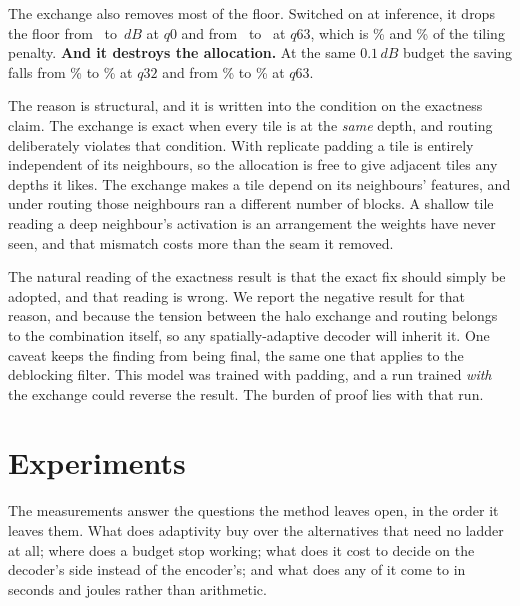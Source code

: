 \documentclass[10pt,twocolumn,letterpaper]{article}
\newcommand{\dB}{\,dB}
\begin{document}
The exchange also removes most of the floor. Switched on at inference, it drops
the floor from \CoupFloorPadLow\ to \CoupFloorCplLow$\dB$ at $q0$ and from
\CoupFloorPadHigh\ to \CoupFloorCplHigh\ at $q63$, which is
\CoupFloorDropLow\% and \CoupFloorDropHigh\% of the tiling penalty.
\textbf{And it destroys the allocation.} At the same $0.1\dB$ budget the saving
falls from \CoupPaddedMid\% to \CoupCoupledMid\% at $q32$ and from
\CoupPaddedHigh\% to \CoupCoupledHigh\% at $q63$.

The reason is structural, and it is written into the condition on the exactness
claim. The exchange is exact when every tile is at the \emph{same} depth, and routing
deliberately violates that condition. With replicate padding a tile is entirely
independent of its neighbours, so the allocation is free to give adjacent tiles
any depths it likes. The exchange makes a tile depend on its neighbours' features, and
under routing those neighbours ran a different number of blocks. A shallow tile
reading a deep neighbour's activation is an arrangement the weights have never
seen, and that mismatch costs more than the seam it removed.

The natural reading of the exactness result is that the exact fix should simply be
adopted, and that reading is wrong. We report the negative result for that reason,
and because the tension between the halo exchange and routing belongs to the
combination itself, so any spatially-adaptive decoder will inherit it. One
caveat keeps the finding from being final, the same one that applies to the
deblocking filter. This model was trained with padding, and a run trained
\emph{with} the exchange could reverse the result. The burden of proof lies with
that run.

\section{Experiments}

The measurements answer the questions the method leaves open, in the order it
leaves them. What does adaptivity buy over the alternatives that need no ladder
at all; where does a budget stop working; what does it cost to decide on the
decoder's side instead of the encoder's; and what does any of it come to in
seconds and joules rather than arithmetic.
\label{sec:exp}
\end{document}
